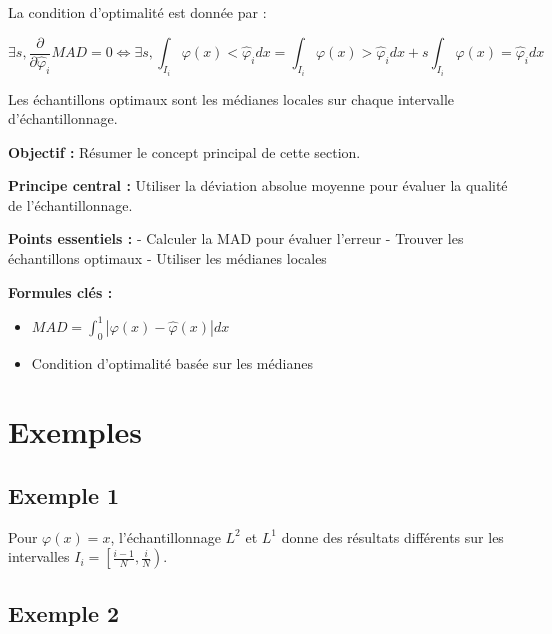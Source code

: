 \documentclass[12pt]{article}
\begin{document}
La condition d'optimalité est donnée par :

\begin{equation}
\exists s, \frac{\partial}{\partial \hat{\varphi}_i} MAD = 0 \iff \exists s, \int_{I_i} \varphi(x) < \hat{\varphi}_i dx = \int_{I_i} \varphi(x) > \hat{\varphi}_i dx + s \int_{I_i} \varphi(x) = \hat{\varphi}_i dx
\end{equation}

Les échantillons optimaux sont les médianes locales sur chaque intervalle d'échantillonnage.

\begin{tcolorbox}[colback=red!5!white, colframe=red!75!black, title={\faBookmark\hspace{0.5em}Fiche Récapitulative}]
  
\textbf{Objectif :} Résumer le concept principal de cette section.

\textbf{Principe central :} Utiliser la déviation absolue moyenne pour évaluer la qualité de l'échantillonnage.

\vspace{0.4em}
\textbf{Points essentiels :}  
- Calculer la MAD pour évaluer l'erreur
- Trouver les échantillons optimaux
- Utiliser les médianes locales

\vspace{0.4em}
\textbf{Formules clés :}  
\begin{itemize}
\item $MAD = \int_0^1 |\varphi(x) - \hat{\varphi}(x)| dx$
\item Condition d'optimalité basée sur les médianes
\end{itemize}

\end{tcolorbox}

\newpage

\section{Exemples}

\subsection{Exemple 1}

Pour $\varphi(x) = x$, l'échantillonnage $L^2$ et $L^1$ donne des résultats différents sur les intervalles $I_i = \left[\frac{i-1}{N}, \frac{i}{N}\right)$.

\subsection{Exemple 2}
\end{document}
